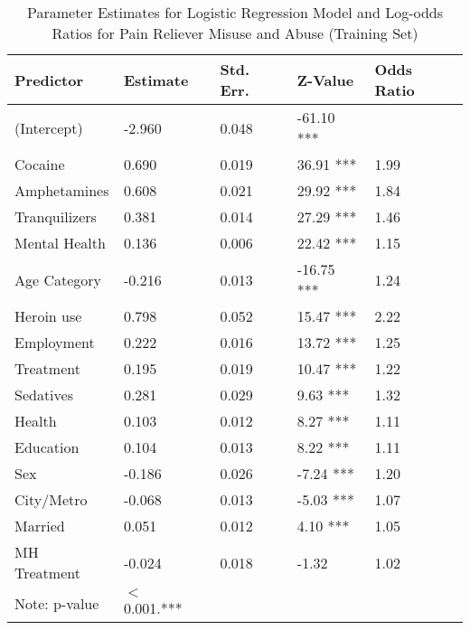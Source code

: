 \documentclass[sigconf]{acmart}
\begin{document}
\begin{table}
  \caption{Parameter Estimates for Logistic Regression Model and Log-odds 
  Ratios for Pain Reliever Misuse and Abuse (Training Set)}
  \label{tab:freq}
  \begin{tabular}{lllll}
    \toprule
    Predictor&  Estimate& Std. Err.& Z-Value & Odds Ratio \\    
    \midrule
    (Intercept)   & -2.960 &   0.048 & -61.10 *** &  \\
    Cocaine       & 0.690  &   0.019 &  36.91 *** & 1.99  \\
    Amphetamines  & 0.608  &   0.021 &  29.92 *** & 1.84  \\
    Tranquilizers & 0.381  &   0.014 &  27.29 *** & 1.46  \\
    Mental Health & 0.136  &   0.006 &  22.42 *** & 1.15  \\
    Age Category  & -0.216 &   0.013 & -16.75 *** & 1.24  \\
    Heroin use    & 0.798  &   0.052 &  15.47 *** & 2.22  \\  
    Employment    & 0.222  &   0.016 &  13.72 *** & 1.25  \\
    Treatment     & 0.195  &   0.019 &  10.47 *** & 1.22  \\
    Sedatives     & 0.281  &   0.029 &   9.63 *** & 1.32  \\   
    Health        & 0.103  &   0.012 &   8.27 *** & 1.11  \\
    Education     & 0.104  &   0.013 &   8.22 *** & 1.11  \\   
    Sex           & -0.186 &   0.026 &  -7.24 *** & 1.20  \\
    City/Metro    & -0.068 &   0.013 &  -5.03 *** & 1.07  \\
    Married       & 0.051  &   0.012 &   4.10 *** & 1.05  \\
    MH Treatment  & -0.024 &   0.018 &  -1.32     & 1.02  \\
    \bottomrule 
    Note: p-value& $<$ 0.001.***  &  &  &   
  \end{tabular}
\end{table}

\end{document}
